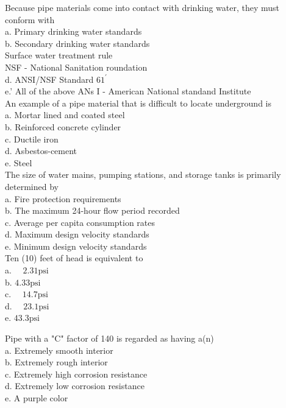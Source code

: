 Because pipe materials come into contact with drinking water, they must conform with\\
a. Primary drinking water standards\\
b. Secondary drinking water standards\\
Surface water treatment rule\\
NSF - National Sanitation roundation\\
d.  ANSI/NSF Standard $61^{\prime}$\\
e.' All of the above ANs I - American National standand Institute\\

An example of a pipe material that is difficult to locate underground is\\
a. Mortar lined and coated steel\\
b. Reinforced concrete cylinder\\
c. Ductile iron\\
d. Asbestos-cement\\
e. Steel\\

The size of water mains, pumping stations, and storage tanks is primarily determined by\\
a. Fire protection requirements\\
b. The maximum 24-hour flow period recorded\\
c. Average per capita consumption rates\\
d. Maximum design velocity standards\\
e. Minimum design velocity standards\\

Ten (10) feet of head is equivalent to\\
a. $\quad 2.31 \mathrm{psi}$\\
b. $4.33 \mathrm{psi}$\\
c. $\quad 14.7 \mathrm{psi}$\\
d. $\quad 23.1 \mathrm{psi}$\\
e. $43.3 \mathrm{psi}$ 

Pipe with a "C" factor of 140 is regarded as having a(n)\\
a. Extremely smooth interior\\
b. Extremely rough interior\\
c. Extremely high corrosion resistance\\
d. Extremely low corrosion resistance\\
e. A purple color\\

